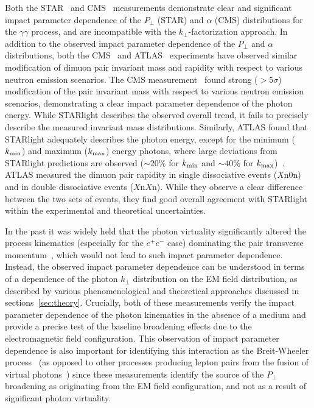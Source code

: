 \documentclass[12pt,epjc3]{svjour3}\sloppy
\begin{document}
Both the STAR~\cite{starcollaborationMeasurementMomentumAngular2021} and CMS~\cite{cmscollaborationObservationForwardNeutron2020a} measurements demonstrate clear and significant impact parameter dependence of the $P_\perp$ (STAR) and $\alpha$ (CMS) distributions for the $\gamma\gamma$ process, and are incompatible with the $k_\perp$-factorization approach.
In addition to the observed impact parameter dependence of the $P_\perp$ and $\alpha$ distributions, both the CMS~\cite{cmscollaborationObservationForwardNeutron2020a} and ATLAS~\cite{atlascollaborationExclusiveDimuonProduction2020} experiments have observed similar modification of dimuon pair invariant mass and rapidity with respect to various neutron emission scenarios. The CMS measurement~\cite{cmscollaborationObservationForwardNeutron2020a} found strong ($>5\sigma$) modification of the pair invariant mass with respect to various neutron emission scenarios, demonstrating a clear impact parameter dependence of the photon energy. While STARlight describes the observed overall trend, it fails to precisely describe the measured invariant mass distributions. Similarly, ATLAS found that STARlight adequately describes the photon energy, except for the minimum ($k_{\rm min}$) and maximum ($k_{\rm max}$) energy photons, where large deviations from STARlight predictions are observed ($\sim20\%$ for $k_{\rm min}$ and $\sim40\%$ for $k_{\rm max}$)~\cite{atlascollaborationExclusiveDimuonProduction2020}. ATLAS measured the dimuon pair rapidity in single dissociative events ($X$n$0$n) and in double dissociative events ($X$n$X$n). While they observe a clear difference between the two sets of events, they find good overall agreement with STARlight within the experimental and theoretical uncertainties. 

In the past it was widely held that the photon virtuality significantly altered the process kinematics (especially for the $e^+e^-$ case) dominating the pair transverse momentum~\cite{baltzPhysicsUltraperipheralCollisions2008}, which would not lead to such impact parameter dependence.
Instead, the observed impact parameter dependence can be understood in terms of a dependence of the photon $k_\perp$ distribution on the EM field distribution, as described by various phenomenological and theoretical approaches discussed in sections~\ref{sec:theory}. 
Crucially, both of these measurements verify the impact parameter dependence of the photon kinematics in the absence of a medium and provide a precise test of the baseline broadening effects due to the electromagnetic field configuration. 
This observation of impact parameter dependence is also important for identifying this interaction as the Breit-Wheeler process~\cite{starcollaborationMeasurementMomentumAngular2021} (as opposed to other processes producing lepton pairs from the fusion of virtual photons~\cite{Landau1934,bethe_h_stopping_1934}) since these measurements identify the source of the $P_\perp$ broadening as originating from the EM field configuration, and not as a result of significant photon virtuality.
\end{document}
